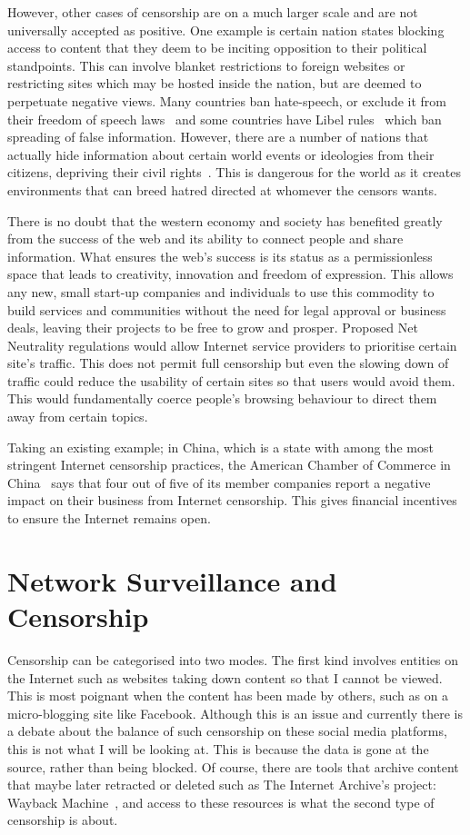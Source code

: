 \documentclass[ %
                    author={Samuel Russell},
                supervisor={Prof. Bogdan Warinschi},
                    degree={MEng},
                     title={Innocuous Ciphertexts},
                  subtitle={The DE-CENSOR Scheme},
                      type={Research},
                      year={2018} ]{dissertation}
\begin{document}
However, other cases of censorship are on a much larger scale and are not universally accepted as positive. One example is certain nation states blocking access to content that they deem to be inciting opposition to their political standpoints. This can involve blanket restrictions to foreign websites or restricting sites which may be hosted inside the nation, but are deemed to perpetuate negative views. Many countries ban hate-speech, or exclude it from their freedom of speech laws~\cite{hate} and some countries have Libel rules~\cite{libel} which ban spreading of false information. However, there are a number of nations that actually hide information about certain world events or ideologies from their citizens, depriving their civil rights~\cite{chincensor}. This is dangerous for the world as it creates environments that can breed hatred directed at whomever the censors wants.

There is no doubt that the western economy and society has benefited greatly from the success of the web and its ability to connect people and share information. What ensures the web's success is its status as a permissionless space that leads to creativity, innovation and freedom of expression. This allows any new, small start-up companies and individuals to use this commodity to build services and communities without the need for legal approval or business deals, leaving their projects to be free to grow and prosper. Proposed Net Neutrality regulations would allow Internet service providers to prioritise certain site's traffic. This does not permit full censorship but even the slowing down of traffic could reduce the usability of certain sites so that users would avoid them. This would fundamentally coerce people's browsing behaviour to direct them away from certain topics.

Taking an existing example; in China, which is a state with among the most stringent Internet censorship practices, the American Chamber of Commerce in China~\cite{amcham} says that four out of five of its member companies report a negative impact on their business from Internet censorship. This gives financial incentives to ensure the Internet remains open.

\section{Network Surveillance and Censorship}

Censorship can be categorised into two modes. The first kind involves entities on the Internet such as websites taking down content so that I cannot be viewed. This is most poignant when the content has been made by others, such as on a micro-blogging site like Facebook. Although this is an issue and currently there is a debate about the balance of such censorship on these social media platforms, this is not what I will be looking at. This is because the data is gone at the source, rather than being blocked. Of course, there are tools that archive content that maybe later retracted or deleted such as The Internet Archive's project: Wayback Machine~\cite{wb}, and access to these resources is what the second type of censorship is about.
\end{document}
